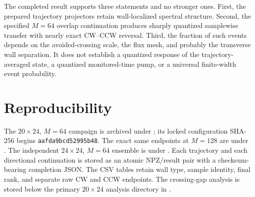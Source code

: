 \documentclass[aps,prb,twocolumn,floatfix,nofootinbib,superscriptaddress]{revtex4-2}
\begin{document}
The completed result supports three statements and no stronger ones.  First,
the prepared trajectory projectors retain wall-localized spectral structure.
Second, the specified $M=64$ overlap continuation produces sharply quantized
samplewise transfer with nearly exact CW--CCW reversal.  Third, the fraction of
such events depends on the avoided-crossing scale, the flux mesh, and probably
the transverse wall separation.  It does not establish a quantized response of
the trajectory-averaged state, a quantized monitored-time pump, or a universal
finite-width event probability.

\section{Reproducibility}

The $20\times24$, $M=64$ campaign is archived under
; its locked configuration
SHA-256 begins \texttt{aafda9bcd52995b48}.  The exact same endpoints at
$M=128$ are under
.  The independent
$24\times24$, $M=64$ ensemble is under
.  Each trajectory
and each directional continuation is stored as an atomic NPZ/result pair with
a checksum-bearing completion JSON.  The CSV tables retain wall type, sample
identity, final rank, and separate raw CW and CCW endpoints.  The crossing-gap
analysis is stored below the primary $20\times24$ analysis directory in
.
\end{document}
